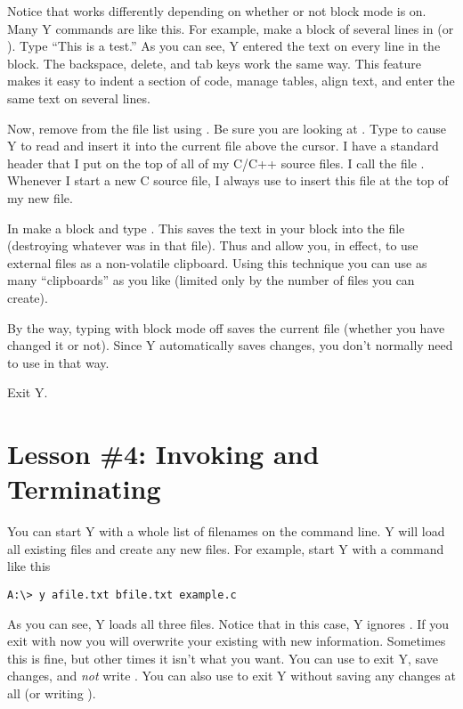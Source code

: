 Notice that  works differently depending on whether or not block mode is on. Many Y
commands are like this. For example, make a block of several lines in  (or
). Type ``This is a test.'' As you can see, Y entered the text on every line
in the block. The backspace, delete, and tab keys work the same way. This feature makes it easy
to indent a section of code, manage tables, align text, and enter the same text on several
lines.

Now, remove  from the file list using . Be sure you are looking at
. Type  to cause Y to read  and
insert it into the current file above the cursor. I have a standard header that I put on the top
of all of my C/C++ source files. I call the file . Whenever I start a new C
source file, I always use  to insert this file at the top of my new file.

In  make a block and type . This saves the text in your
block into the file  (destroying whatever was in that file). Thus 
and  allow you, in effect, to use external files as a non-volatile clipboard. Using
this technique you can use as many ``clipboards'' as you like (limited only by the number of
files you can create).

By the way, typing  with block mode off saves the current file (whether you have
changed it or not). Since Y automatically saves changes, you don't normally need to use
 in that way.

Exit Y.

\section{Lesson \#4: Invoking and Terminating}

You can start Y with a whole list of filenames on the command line. Y will load all existing
files and create any new files. For example, start Y with a command like this

\begin{verbatim}
A:\> y afile.txt bfile.txt example.c
\end{verbatim}

As you can see, Y loads all three files. Notice that in this case, Y ignores
. If you exit with  now you will overwrite your existing
 with new information. Sometimes this is fine, but other times it isn't
what you want. You can use  to exit Y, save changes, and \emph{not} write
. You can also use  to exit Y without saving any changes at
all (or writing ).

